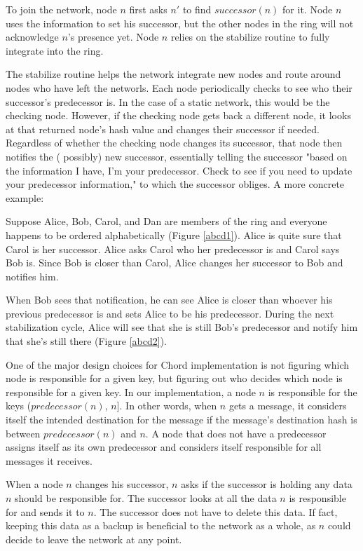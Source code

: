 \documentclass[conference, compsocconf, letterpaper]{IEEEtran}
\begin{document}
To join the network, node $n$ first asks $n'$ to find $successor(n)$ for it.  Node $n$ uses the information to set his successor, but the other nodes in the ring will not acknowledge $n$'s presence yet.  Node $n$ relies on the stabilize routine to fully integrate into the ring.

The stabilize routine helps the network integrate new nodes and route around nodes who have left the networls. Each node periodically checks to see who their successor's predecessor is.  In the case of a static network, this would be the checking node.  However, if the checking node gets back a different node, it looks at that returned node's hash value and changes their successor if needed.  Regardless of whether the checking node changes its successor, that node then notifies the ( possibly) new successor,  essentially telling the successor "based on the information I have, I'm your predecessor.  Check to see if you need to update your predecessor information," to which the successor obliges.  A more concrete example:


Suppose Alice, Bob, Carol, and Dan are members of the ring and everyone happens to be ordered alphabetically (Figure \ref{abcd1}). Alice is quite sure that Carol is her successor.  Alice asks Carol who her predecessor is and Carol says Bob is.  Since Bob is closer than Carol, Alice changes her successor to Bob and notifies him.  

When Bob sees that notification, he can see Alice is closer than whoever his previous predecessor is and sets Alice to be his predecessor.  During the next stabilization cycle, Alice will see that she is still Bob's predecessor and notify him that she's still there (Figure \ref{abcd2}).

One of the major design choices for Chord implementation is not figuring which node is responsible for a given key, but figuring out who decides which node is responsible for a given key.  In our implementation, a node $n$ is responsible for the keys ($predecessor(n)$, $n$].  In other words, when $n$ gets a message, it considers itself the intended destination for the message if the message's destination hash is between $predecessor(n)$ and $n$.  A node that does not have a predecessor assigns itself as its own predecessor and considers itself responsible for all messages it receives. 

When a node $n$ changes his successor, $n$ asks if the successor is holding any data $n$ should be responsible for.  The successor looks at all the data $n$ is responsible for and sends it  to $n$.  The successor does not have to delete this data. If fact, keeping this data as a backup is beneficial to the network as a whole, as $n$ could decide to leave the network at any point. 
\end{document}
